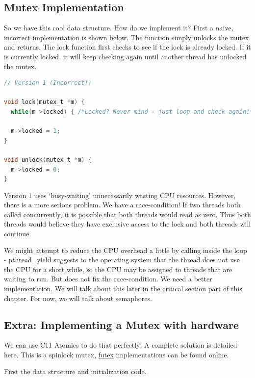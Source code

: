 \subsection{Mutex Implementation}

So we have this cool data structure.
How do we implement it?
First a naive, incorrect implementation is shown below.
The  function simply unlocks the mutex and returns.
The lock function first checks to see if the lock is already locked.
If it is currently locked, it will keep checking again until another thread has unlocked the mutex.

\begin{lstlisting}[language=C]
// Version 1 (Incorrect!)

void lock(mutex_t *m) {
  while(m->locked) { /*Locked? Never-mind - just loop and check again!*/ }

  m->locked = 1;
}

void unlock(mutex_t *m) {
  m->locked = 0;
}
\end{lstlisting}

Version 1 uses `busy-waiting' unnecessarily wasting CPU resources.
However, there is a more serious problem.
We have a race-condition!
If two threads both called  concurrently, it is possible that both threads would read  as zero.
Thus both threads would believe they have exclusive access to the lock and both threads will continue.

We might attempt to reduce the CPU overhead a little by calling  inside the loop - pthread\_yield suggests to the operating system that the thread does not use the CPU for a short while, so the CPU may be assigned to threads that are waiting to run.
But does not fix the race-condition.
We need a better implementation.
We will talk about this later in the critical section part of this chapter.
For now, we will talk about semaphores.

\subsection{Extra: Implementing a Mutex with hardware}

We can use C11 Atomics to do that perfectly!
A complete solution is detailed here.
This is a spinlock mutex, \href{https://locklessinc.com/articles/mutex_cv_futex/}{futex} implementations can be found online.

First the data structure and initialization code.

